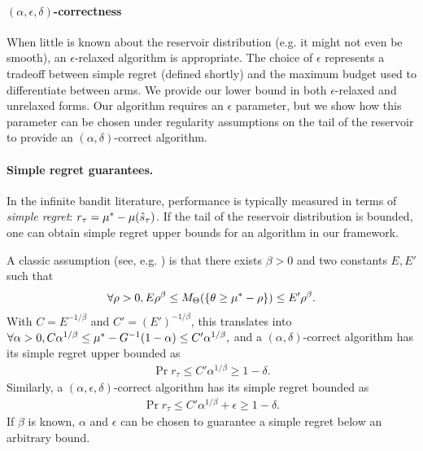 \paragraph{$(\alpha, \epsilon, \delta)$-correctness}
When little is known about the reservoir distribution
(e.g. it might not even be smooth), an $\epsilon$-relaxed algorithm is 
appropriate.
The choice of $\epsilon$ represents a tradeoff between simple regret
(defined shortly)
and the maximum budget used to differentiate between arms.
We provide our lower bound in both $\epsilon$-relaxed and unrelaxed forms.
Our algorithm requires an $\epsilon$ parameter, but we show how this parameter
can be chosen under regularity assumptions on the tail of the reservoir to
provide an $(\alpha,\delta)$-correct algorithm.


\paragraph{Simple regret guarantees.} In the infinite bandit literature,
performance is typically measured in
terms of
\emph{simple regret}: $r_\tau = \mu^* - \mu(\hat{s}_\tau)$.
If the tail of the reservoir distribution is bounded, one
can obtain simple regret upper bounds for an
algorithm in our framework.

A classic assumption (see, e.g. \cite{DBLP:journals/corr/CarpentierV15}) is
that there
exists $\beta >0$ and two constants $E,E'$ such that
%
\vspace{-10pt}
%
\begin{align}
\forall \rho >0,
	E\rho^\beta \leq \ExpRewardMeasure(\Set{\expReward
\geq \ArmMean^* - \rho})
	\leq E'\rho^\beta.\label{ass:smoothness}
\end{align}
With $C = E^{-1/\beta}$ and $C'=(E')^{-1/\beta}$, this translates into 
$
\forall \alpha >0, C\alpha^{1/\beta}
	\leq \mu^* - G^{-1}(1-\alpha)
	\leq C' \alpha^{1/\beta},
$
and a $(\alpha,\delta)$-correct algorithm has its simple regret upper bounded as
%
\vspace{-10pt}
%
\begin{align}
\Pr{ r_\tau \leq C'\alpha^{1/\beta} } \geq 1-\delta.
\end{align}
Similarly, a $(\alpha,\epsilon,\delta)$-correct algorithm has its simple regret bounded
as
%
\vspace{-10pt}
%
\begin{align}
\Pr{ r_\tau \leq C'\alpha^{1/\beta} + \epsilon }
	\geq 1-\delta.
\end{align}
If
$\beta$ is known, $\alpha$ and $\epsilon$
can be chosen to guarantee a simple regret below an arbitrary bound.

